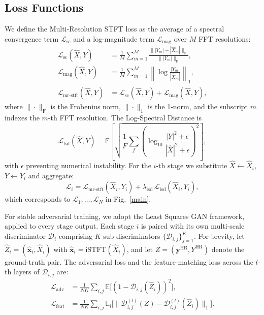 \documentclass[journal]{IEEEtran}
\begin{document}
\subsection{Loss Functions}
We define the Multi-Resolution STFT loss as the average of a spectral convergence term $\mathcal{L}_{\mathrm{sc}}$ and a log-magnitude term $\mathcal{L}_{\mathrm{mag}}$ over $M$ FFT resolutions:
\begin{align}
    \mathcal{L}_{\mathrm{sc}}(\hat{X}, Y) &= \frac{1}{M}\sum_{m=1}^{M} \frac{\bigl\| |Y_m| - |\hat{X}_m| \bigr\|_{\mathrm{F}}}{\bigl\| |Y_m| \bigr\|_{\mathrm{F}}}, \\
    \mathcal{L}_{\mathrm{mag}}(\hat{X}, Y) &= \frac{1}{M}\sum_{m=1}^{M} \left\| \log \frac{|Y_m|}{|\hat{X}_m|} \right\|_1, \\
    \mathcal{L}_{\mathrm{mr\text{-}stft}}(\hat{X}, Y) &= \mathcal{L}_{\mathrm{sc}}(\hat{X}, Y) + \mathcal{L}_{\mathrm{mag}}(\hat{X}, Y),
\end{align}
where $\|\cdot\|_{\mathrm{F}}$ is the Frobenius norm,  $\|\cdot\|_{\mathrm{1}}$ is the 1‑norm, and the subscript $m$ indexes the $m$-th FFT resolution. The Log-Spectral Distance is
\begin{equation}
    \mathcal{L}_{\mathrm{lsd}}(\hat{X}, Y) = \mathbb{E} \left[ \sqrt{ \frac{1}{F} \sum_{f} \left( \log_{10} \frac{|Y|^2 + \epsilon}{|\hat{X}|^2 + \epsilon} \right)^2 } \right],
\end{equation}
with $\epsilon$ preventing numerical instability. For the $i$-th stage we substitute $\hat{X} \leftarrow \hat{X}_i$, $Y \leftarrow Y_{i}$ and aggregate:
\begin{equation}
    \mathcal{L}_i = \mathcal{L}_{\mathrm{mr\text{-}stft}}(\hat{X}_i, Y_{i}) + \lambda_{\mathrm{lsd}}\,\mathcal{L}_{\mathrm{lsd}}(\hat{X}_i, Y_{i}),
\end{equation}
which corresponds to $\mathcal{L}_1, \dots, \mathcal{L}_N$ in Fig.~\ref{main}.

For stable adversarial training, we adopt the Least Squares GAN \cite{mao2017least} framework, applied to every stage output. Each stage $i$ is paired with its own multi-scale discriminator $\mathcal{D}_{i}$ \cite{melgan} comprising $K$ sub-discriminators $\{\mathcal{D}_{i,j}\}_{j=1}^{K}$. For brevity, let $\hat{Z}_i = (\hat{\mathbf{x}}_i, \hat{X}_i)$ with $\hat{\mathbf{x}}_i = \text{iSTFT}(\hat{X}_i)$, and let $Z = (\mathbf{y}^{\mathrm{HR}}, Y^{\mathrm{HR}})$ denote the ground-truth pair. The adversarial loss and the feature-matching loss across the $l$-th layers of $\mathcal{D}_{i,j}$ are:
\begin{align}
    \mathcal{L}_{\mathrm{adv}} &= \frac{1}{N K} \sum_{i,j} \mathbb{E} \bigl[ (1 - \mathcal{D}_{i,j}(\hat{Z}_i))^2 \bigr], \\
    \mathcal{L}_{\mathrm{feat}} &= \frac{1}{N K} \sum_{i,j} \mathbb{E}_{l} \bigl[ \bigl\| \mathcal{D}_{i,j}^{(l)}(Z) - \mathcal{D}_{i,j}^{(l)}(\hat{Z}_i) \bigr\|_1 \bigr].
\end{align}
\end{document}
